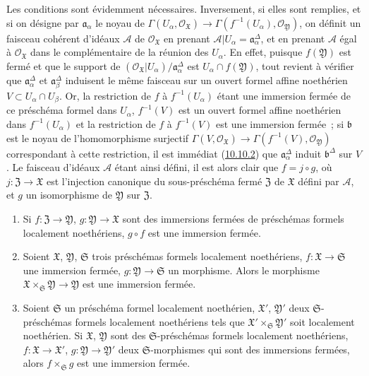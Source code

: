 Les conditions sont évidemment nécessaires. Inversement, si elles sont
remplies, et si on désigne par $\mathfrak{a}_\alpha$ le noyau de
$\Gamma(U_\alpha,\mathscr{O}_{\mathfrak{X}})\to
\Gamma(f^{-1}(U_\alpha),\mathscr{O}_{\mathfrak{Y}})$, on définit un faisceau
cohérent d'idéaux $\mathscr{A}$ de $\mathscr{O}_{\mathfrak{X}}$ en prenant
$\mathscr{A}|U_\alpha=\mathfrak{a}_\alpha^\Delta$, et en prenant $\mathscr{A}$
égal à $\mathscr{O}_{\mathfrak{X}}$ dans le complémentaire de la réunion des $U_\alpha$. En effet, puisque
$f(\mathfrak{Y})$ est fermé et que le support de
$(\mathscr{O}_{\mathfrak{X}}|U_\alpha)/\mathfrak{a}_\alpha^\Delta$ est $U_\alpha\cap f(\mathfrak{Y})$, tout revient
à vérifier que $\mathfrak{a}_\alpha^\Delta$ et
$\mathfrak{a}_\beta^\Delta$ induisent le même faisceau sur un ouvert formel
affine noethérien $V\subset U_\alpha\cap U_\beta$. Or, la restriction de $f$
à $f^{-1}(U_\alpha)$ étant une immersion fermée de ce préschéma formel dans
$U_\alpha$, $f^{-1}(V)$ est un ouvert formel affine noethérien dans
$f^{-1}(U_\alpha)$ et la restriction de $f$ à $f^{-1}(V)$ est une immersion
fermée~; si $\mathfrak{b}$ est le noyau de l'homomorphisme surjectif
$\Gamma(V,\mathscr{O}_{\mathfrak{X}})\to
\Gamma(f^{-1}(V),\mathscr{O}_{\mathfrak{Y}})$ correspondant à cette
restriction, il est immédiat (\hyperref[I.10.10.2-fr]{10.10.2}) que
$\mathfrak{a}_\alpha^\Delta$ induit $\mathfrak{b}^\Delta$ sur $V$. Le faisceau
d'idéaux $\mathscr{A}$ étant ainsi défini, il est alors clair que
$f=j\circ g$, où $j:\mathfrak{Z}\to\mathfrak{X}$ est l'injection canonique du
sous-préschéma fermé $\mathfrak{Z}$ de $\mathfrak{X}$ défini par
$\mathscr{A}$, et $g$ un isomorphisme de $\mathfrak{Y}$ sur $\mathfrak{Z}$.

\begin{proposition}[10.14.5]
\label{I.10.14.5-fr}
\begin{enumerate}
  \item[\rm{(i)}] Si $f:\mathfrak{Z}\to\mathfrak{Y}$,
  $g:\mathfrak{Y}\to\mathfrak{X}$ sont des immersions fermées de préschémas
  formels localement noethériens, $g\circ f$ est une immersion fermée.

  \item[\rm{(ii)}] Soient $\mathfrak{X}$, $\mathfrak{Y}$, $\mathfrak{S}$ trois
  préschémas formels localement noethériens,
  $f:\mathfrak{X}\to\mathfrak{S}$ une immersion fermée,
  $g:\mathfrak{Y}\to\mathfrak{S}$ un morphisme. Alors le morphisme
  $\mathfrak{X}\times_{\mathfrak{S}}\mathfrak{Y}\to\mathfrak{Y}$ est une
  immersion fermée.
  \item[\rm{(iii)}] Soient $\mathfrak{S}$ un préschéma formel localement
  noethérien, $\mathfrak{X}'$, $\mathfrak{Y}'$ deux
  $\mathfrak{S}$-préschémas formels localement noethériens tels que
  $\mathfrak{X}'\times_{\mathfrak{S}}\mathfrak{Y}'$ soit localement
  noethérien. Si $\mathfrak{X}$, $\mathfrak{Y}$ sont des
  $\mathfrak{S}$-préschémas formels localement noethériens,
  $f:\mathfrak{X}\to\mathfrak{X}'$, $g:\mathfrak{Y}\to\mathfrak{Y}'$ deux
  $\mathfrak{S}$-morphismes qui sont des immersions fermées, alors
  $f\times_{\mathfrak{S}}g$ est une immersion fermée.
\end{enumerate}
\end{proposition}

